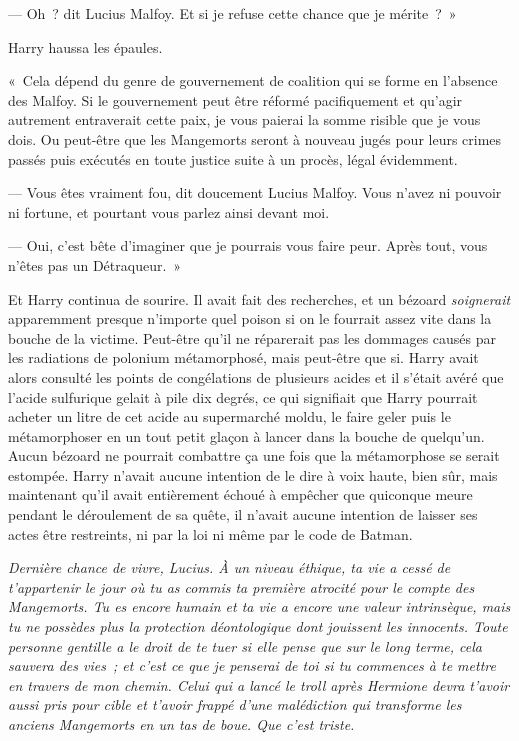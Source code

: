 --- Oh~? dit Lucius Malfoy. Et si je refuse cette chance que je mérite~?~»

Harry haussa les épaules.

«~Cela dépend du genre de gouvernement de coalition qui se forme en l'absence des Malfoy. Si le gouvernement peut être réformé pacifiquement et qu'agir autrement entraverait cette paix, je vous paierai la somme risible que je vous dois. Ou peut-être que les Mangemorts seront à nouveau jugés pour leurs crimes passés puis exécutés en toute justice suite à un procès, légal évidemment.

--- Vous êtes vraiment fou, dit doucement Lucius Malfoy. Vous n'avez ni pouvoir ni fortune, et pourtant vous parlez ainsi devant moi.

--- Oui, c'est bête d'imaginer que je pourrais vous faire peur. Après tout, vous n'êtes pas un Détraqueur.~»

Et Harry continua de sourire. Il avait fait des recherches, et un bézoard \emph{soignerait} apparemment presque n'importe quel poison si on le fourrait assez vite dans la bouche de la victime. Peut-être qu'il ne réparerait pas les dommages causés par les radiations de polonium métamorphosé, mais peut-être que si. Harry avait alors consulté les points de congélations de plusieurs acides et il s'était avéré que l'acide sulfurique gelait à pile dix degrés, ce qui signifiait que Harry pourrait acheter un litre de cet acide au supermarché moldu, le faire geler puis le métamorphoser en un tout petit glaçon à lancer dans la bouche de quelqu'un. Aucun bézoard ne pourrait combattre ça une fois que la métamorphose se serait estompée. Harry n'avait aucune intention de le dire à voix haute, bien sûr, mais maintenant qu'il avait entièrement échoué à empêcher que quiconque meure pendant le déroulement de sa quête, il n'avait aucune intention de laisser ses actes être restreints, ni par la loi ni même par le code de Batman.

\emph{Dernière chance de vivre, Lucius. À un niveau éthique, ta vie a cessé de t'appartenir le jour où tu as commis ta première atrocité pour le compte des Mangemorts. Tu es encore humain et ta vie a encore une valeur intrinsèque, mais tu ne possèdes plus la protection déontologique dont jouissent les innocents. Toute personne gentille a le droit de te tuer si elle pense que sur le long terme, cela sauvera des vies~; et c'est ce que je penserai de toi si tu commences à te mettre en travers de mon chemin. Celui qui a lancé le troll après Hermione devra t'avoir aussi pris pour cible et t'avoir frappé d'une malédiction qui transforme les anciens Mangemorts en un tas de boue. Que c'est triste.}


